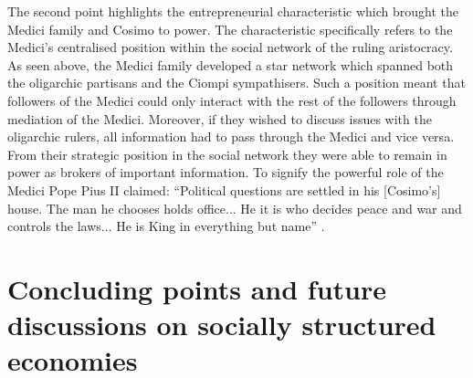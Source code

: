 The second point highlights the entrepreneurial characteristic which brought the Medici family and Cosimo to power. The characteristic specifically refers to the Medici's centralised position within the social network of the ruling aristocracy. As seen above, the Medici family developed a star network which spanned both the oligarchic partisans and the Ciompi sympathisers. Such a position meant that followers of the Medici could only interact with the rest of the followers through mediation of the Medici. Moreover, if they wished to discuss issues with the oligarchic rulers, all information had to pass through the Medici and vice versa. From their strategic position in the social network they were able to remain in power as brokers of important information. To signify the powerful role of the Medici Pope Pius II claimed: ``Political questions are settled in his [Cosimo's] house. The man he chooses holds office... He it is who decides peace and war and controls the laws... He is King in everything but name'' \citep{Hibbert1980}.

\section{Concluding points and future discussions on socially structured economies}
\label{sec:ConcludingPoints}

